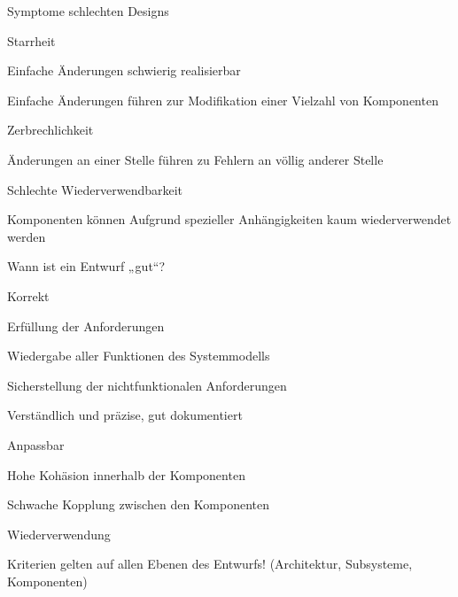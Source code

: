 \documentclass[a4paper]{article}
\begin{document}
\begin{multicols}{3}
  Symptome schlechten Designs
  \begin{itemize*}
    \item Starrheit
          \begin{itemize*}
            \item Einfache Änderungen schwierig realisierbar
            \item Einfache Änderungen führen zur Modifikation einer Vielzahl von Komponenten
          \end{itemize*}
    \item Zerbrechlichkeit
          \begin{itemize*}
            \item Änderungen an einer Stelle führen zu Fehlern an völlig anderer Stelle
          \end{itemize*}
    \item Schlechte Wiederverwendbarkeit
          \begin{itemize*}
            \item Komponenten können Aufgrund spezieller Anhängigkeiten kaum wiederverwendet werden
          \end{itemize*}
  \end{itemize*}

  Wann ist ein Entwurf „gut“?
  \begin{itemize*}
    \item Korrekt
          \begin{itemize*}
            \item Erfüllung der Anforderungen
            \item Wiedergabe aller Funktionen des Systemmodells
            \item Sicherstellung der nichtfunktionalen Anforderungen
          \end{itemize*}
    \item Verständlich und präzise, gut dokumentiert
    \item Anpassbar
    \item Hohe Kohäsion innerhalb der Komponenten
    \item Schwache Kopplung zwischen den Komponenten
    \item Wiederverwendung
    \item Kriterien gelten auf allen Ebenen des Entwurfs! (Architektur, Subsysteme, Komponenten)
  \end{itemize*}


\end{multicols}
\end{document}

